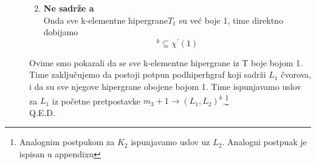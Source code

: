 \documentclass[a4paper]{article}
\begin{document}
\begin{description}
\begin{enumerate}
\begin{equation}
				\end{equation}
			\item  \textbf{Ne sadrže a} \\
				Onda sve k-elementne hipergrane$T_1$ su već boje 1, time direktno dobijamo
				\begin{equation}
					[ T ]^k \subseteq \chi^\prime (1)
				\end{equation}
		\end{enumerate}
		Ovime smo pokazali da se sve k-elementne hipergrane iz T boje bojom 1. Time zaključujemo da postoji potpun podhiperhgraf koji sadrži $L_1$ čvorova, i da su sve njegove hipergrane obojene bojom 1. Time ispunjavamo uslov za $L_1$ iz početne pretpostavke $m_3 + 1 \rightarrow (L_1, L_2)^k$.\footnote{Analognim postpukom za $K_2$ ispunjavamo uslov uz $L_2$. Analogni postpuak je ispisan u appendixu}\\
		{\large Q.E.D.}
	\end{description}
\end{document}
